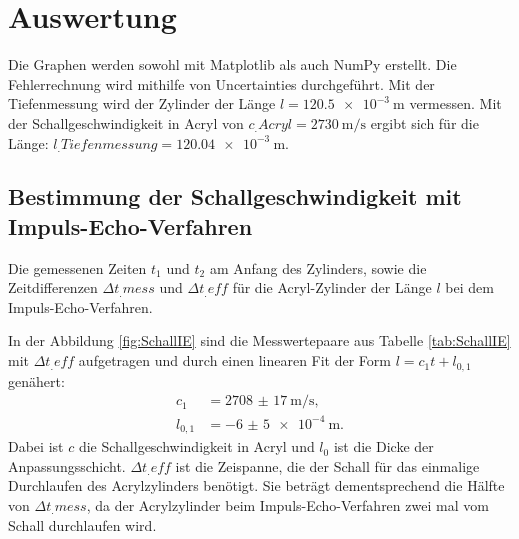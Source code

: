 \section{Auswertung}
\label{sec:Auswertung}


Die Graphen werden sowohl mit Matplotlib \cite{matplotlib} als auch NumPy \cite{numpy} erstellt. Die Fehlerrechnung wird mithilfe von Uncertainties \cite{uncertainties} durchgeführt. Mit der Tiefenmessung wird der Zylinder der Länge $l=\SI{120,5e-3}{\metre}$ vermessen. Mit der Schallgeschwindigkeit in Acryl von $c_.{Acryl}=\SI{2730}{\meter\per\second}$ \cite{cAcryl} ergibt sich für die Länge: $l_.{Tiefenmessung}=\SI{120.04e-3}{\metre}$.

\subsection{Bestimmung der Schallgeschwindigkeit mit Impuls-Echo-Verfahren}

\begin{table}
	\centering
	\caption{Die gemessenen Zeiten $t_1$ und $t_2$ am Anfang des Zylinders, sowie die Zeitdifferenzen $\Delta t_.{mess}$ und $\Delta t_.{eff}$ für die Acryl-Zylinder der Länge $l$ bei dem Impuls-Echo-Verfahren.}
	
	\label{tab:SchallIE}
\end{table}

\noindent In der Abbildung \ref{fig:SchallIE} sind die Messwertepaare aus Tabelle \ref{tab:SchallIE} mit $\Delta t_.{eff}$ aufgetragen und durch einen linearen Fit der Form $l=c_1 t + l_{0,1}$ genähert:
\begin{align*}
	c_1&=\SI{2708(17)}{\meter\per\second}\text{,}\\
	l_{0,1}&=\SI{-6(5)e-4}{\meter}\text{.}
\end{align*}
Dabei ist $c$ die Schallgeschwindigkeit in Acryl und $l_0$ ist die Dicke der Anpassungsschicht. $\Delta t_.{eff}$ ist die Zeispanne, die der Schall für das einmalige Durchlaufen des Acrylzylinders benötigt. Sie beträgt dementsprechend die Hälfte von $\Delta t_.{mess}$, da der Acrylzylinder beim Impuls-Echo-Verfahren zwei mal vom Schall durchlaufen wird.

